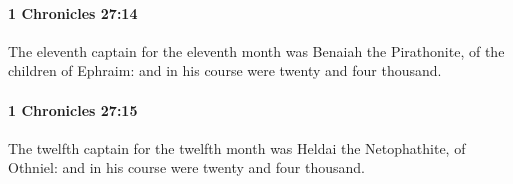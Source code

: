 		\paragraph{1 Chronicles 27:14} %
			\label{1CHRONICLES-27-14}

			The eleventh captain for the eleventh month was Benaiah the Pirathonite, of the children of Ephraim: and in his course were twenty and four thousand.


		\paragraph{1 Chronicles 27:15} %
			\label{1CHRONICLES-27-15}

			The twelfth captain for the twelfth month was Heldai the Netophathite, of Othniel: and in his course were twenty and four thousand.


